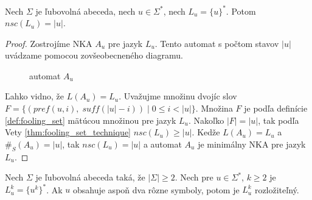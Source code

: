\begin{lemma}
\label{lm:one_word_cycle_nsc}
Nech $ \Sigma $ je ľubovolná abeceda, nech $ u \in \Sigma^* $, nech $ L_u = \lbrace u \rbrace^* $. Potom $ nsc(L_u) = |u| $.
\end{lemma}

\begin{proof}
Zostrojíme NKA $ A_u $ pre jazyk $ L_u $. Tento automat s počtom stavov $ |u| $ uvádzame pomocou zovšeobecneného diagramu.

\begin{figure}[H]
\centering
{}
\caption{automat $ A_u $}
\end{figure}
Ľahko vidno, že $ L(A_u) = L_u $. Uvažujme množinu dvojíc slov $ F = \lbrace (pref(u,i), \; suff(|u|-i)) \; | \; 0 \leq i < |u| \rbrace $. Množina $ F $ je podľa definície \ref{def:fooling_set} mätúcou množinou pre jazyk $ L_u $. Nakoľko $ |F|=|u| $, tak podľa Vety \ref{thm:fooling_set_technique} $ nsc(L_u) \geq |u| $. Kedže $ L(A_u) = L_u $ a $ \#_S(A_u) = |u| $, tak $ nsc(L_u) = |u| $ a automat $ A_u $ je minimálny NKA pre jazyk $ L_u $.
\end{proof}

\begin{proposition}
Nech $ \Sigma $ je ľubovolná abeceda taká, že $ |\Sigma| \geq 2 $. Nech pre $ u \in \Sigma^* $, $ k \geq 2 $ je $ L_u^k = \lbrace u^k \rbrace^* $. Ak $ u $ obsahuje aspoň dva rôzne symboly, potom je $ L_u^k $ rozložiteľný.
\end{proposition}

